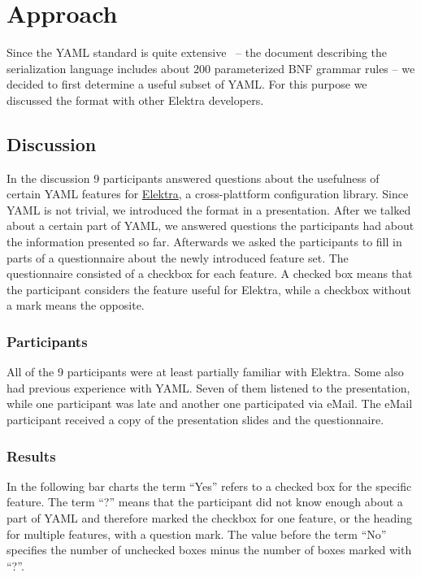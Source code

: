 \chapter{Approach}

Since the YAML standard is quite extensive~\cite{ben2009yaml} – the document describing the serialization language includes about 200 parameterized \gls{BNF} grammar rules – we decided to first determine a useful subset of YAML. For this purpose we discussed the format with other Elektra developers.

\section{Discussion}

In the discussion 9 participants answered questions about the usefulness of certain YAML features for \href{https://www.libelektra.org}{Elektra}, a cross-plattform configuration library. Since YAML is not trivial, we introduced the format in a presentation. After we talked about a certain part of YAML, we answered questions the participants had about the information presented so far. Afterwards we asked the participants to fill in parts of a questionnaire about the newly introduced feature set. The questionnaire consisted of a checkbox for each feature. A checked box means that the participant considers the feature useful for Elektra, while a checkbox without a mark means the opposite.

\subsection{Participants}

All of the 9 participants were at least partially familiar with Elektra. Some also had previous experience with YAML. Seven of them listened to the presentation, while one participant was late and another one participated via eMail. The eMail participant received a copy of the presentation slides and the questionnaire.

\subsection{Results}

In the following bar charts the term “Yes” refers to a checked box for the specific feature. The term “?” means that the participant did not know enough about a part of YAML and therefore marked the checkbox for one feature, or the heading for multiple features, with a question mark. The value before the term “No” specifies the number of unchecked boxes minus the number of boxes marked with “?”.

